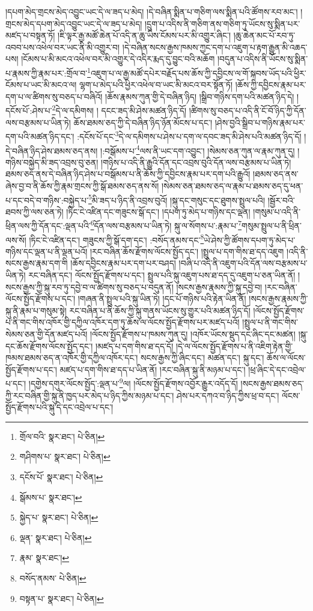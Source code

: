 །དཔག་མེད་གྲངས་མེད་འབྱུང་ཡང་དེ་ལ་ཟད་པ་མེད། །དེ་བཞིན་སྨིན་པ་གཅིག་ལས་སྨིན་པའི་ཚོགས་རབ་མང་། །གྲངས་མེད་དཔག་མེད་འབྱུང་ཡང་དེ་ལ་ཟད་པ་མེད། །དྲུག་པ་འདིས་ནི་གཅིག་ནས་གཅིག་ཏུ་ཡོངས་སུ་སྨིན་པར་མཛད་པ་བསྟན་ཏོ། །ཇི་ལྟར་རྒྱ་མཚོ་ཆེན་པོ་འདི་ན་ཆུ་ཡིས་ངོམས་པར་མི་འགྱུར་ཞིང་། །ཆུ་ཆེན་མང་པོ་རབ་ཏུ་འབབ་པས་འཕེལ་བར་ཡང་ནི་མི་འགྱུར་བ། །དེ་བཞིན་སངས་རྒྱས་ཁམས་ཀྱང་དག་པ་འཇུག་པ་རྟག་རྒྱུན་མི་འཆད་པས། །ངོམས་པ་མི་མངའ་འཕེལ་བར་མི་འགྱུར་དེ་འདིར་རྨད་དུ་བྱུང་བའི་མཆོག །བདུན་པ་འདིས་ནི་ཡོངས་སུ་སྨིན་པ་རྣམས་ཀྱི་རྣམ་པར་:གྲོལ་བ་\footnote{གྲོལ་བའི་  སྣར་ཐང་།  པེ་ཅིན། }འཇུག་པ་ལ་རྒྱ་མཚོ་དཔེར་བརྗོད་པས་ཆོས་ཀྱི་དབྱིངས་ལ་གོ་སྐབས་ཡོད་པའི་ཕྱིར་ངོམས་པ་ཡང་མི་མངའ་ལ། ལྷག་པ་མེད་པའི་ཕྱིར་འཕེལ་བ་ཡང་མི་མངའ་བར་སྟོན་ཏོ། །ཆོས་ཀྱི་དབྱིངས་རྣམ་པར་དག་པ་ལ་ཚིགས་སུ་བཅད་པ་བཞིའོ། །ཆོས་རྣམས་ཀུན་གྱི་དེ་བཞིན་ཉིད། །སྒྲིབ་གཉིས་དག་པའི་མཚན་ཉིད་དེ། །དངོས་པོ་:ཤེས་པ་\footnote{གཤིགས་པ་  སྣར་ཐང་།  པེ་ཅིན། }དེ་ལ་དམིགས། །
དངང་ཟད་མི་ཤེས་མཚན་ཉིད་དོ། །ཚིགས་སུ་བཅད་པ་འདི་ནི་ངོ་བོ་ཉིད་ཀྱི་དོན་ལས་བརྩམས་པ་ཡིན་ཏེ། ཆོས་ཐམས་ཅད་ཀྱི་དེ་བཞིན་ཉིད་ཉོན་མོངས་པ་དང་། །ཤེས་བྱའི་སྒྲིབ་པ་གཉིས་རྣམ་པར་དག་པའི་མཚན་ཉིད་དང་། :དངོས་པོ་དང་\footnote{དངོས་པོ་  སྣར་ཐང་།  པེ་ཅིན། }དེ་ལ་དམིགས་པ་ཤེས་པ་དག་ལ་དབང་ཟད་མི་ཤེས་པའི་མཚན་ཉིད་དོ། །དེ་བཞིན་ཉིད་ཤེས་ཐམས་ཅད་ནས། །:བསྒོམས་པ་\footnote{སྒོམས་པ་  སྣར་ཐང་། }ལས་ནི་ཡང་དག་འབྱུང་། །སེམས་ཅན་ཀུན་ལ་རྣམ་ཀུན་དུ། །གཉིས་བསྐྱེད་མི་ཟད་འབྲས་བུ་ཅན། །གཉིས་པ་འདི་ནི་རྒྱུའི་དོན་དང་འབྲས་བུའི་དོན་ལས་བརྩམས་པ་ཡིན་ཏེ། ཐམས་ཅད་ནས་དེ་བཞིན་ཉིད་ཤེས་པ་བསྒོམས་པ་ནི་ཆོས་ཀྱི་དབྱིངས་རྣམ་པར་དག་པའི་རྒྱུའོ། །ཐམས་ཅད་ནས་ཞེས་བྱ་བ་ནི་ཆོས་ཀྱི་རྣམ་གྲངས་ཀྱི་སྒོ་ཐམས་ཅད་ནས་སོ། །སེམས་ཅན་ཐམས་ཅད་ལ་རྣམ་པ་ཐམས་ཅད་དུ་ཕན་པ་དང་བདེ་བ་གཉིས་:བསྐྱེད་པ་\footnote{སྐྱེད་པ་  སྣར་ཐང་།  པེ་ཅིན། }མི་ཟད་པ་ཉིད་ནི་འབྲས་བུའོ། །སྐུ་དང་གསུང་དང་ཐུགས་སྤྲུལ་པའི། །སྦྱོར་བའི་ཐབས་ཀྱི་ལས་ཅན་ཏེ། །ཏིང་ངེ་འཛིན་དང་གཟུངས་སྒོ་དང་། །དཔག་ཏུ་མེད་པ་གཉིས་དང་ལྡན། །གསུམ་པ་འདི་ནི་ཕྲིན་ལས་ཀྱི་དོན་དང་:ལྡན་པའི་\footnote{ལྡན་  སྣར་ཐང་།  པེ་ཅིན། }དོན་ལས་བརྩམས་པ་ཡིན་ཏེ། སྐུ་ལ་སོགས་པ་:རྣམ་པ་\footnote{རྣམ་  སྣར་ཐང་། }གསུམ་སྤྲུལ་པ་ནི་ཕྲིན་ལས་སོ། །ཏིང་ངེ་འཛིན་དང་། གཟུངས་ཀྱི་སྒོ་དག་དང་། :བསོད་ནམས་དང་\footnote{བསོད་ནམས་  པེ་ཅིན། }ཡེ་ཤེས་ཀྱི་ཚོགས་དཔག་ཏུ་མེད་པ་གཉིས་དང་ལྡན་པ་ནི་ལྡན་པའོ། །རང་བཞིན་ཆོས་རྫོགས་ལོངས་སྤྱོད་དང་། །སྤྲུལ་པ་དག་གིས་ཐ་དད་འཇུག །འདི་ནི་སངས་རྒྱས་རྣམ་དག་གི །ཆོས་དབྱིངས་རྣམ་པར་དག་པར་བཤད། །བཞི་པ་འདི་ནི་འཇུག་པའི་དོན་ལས་བརྩམས་པ་ཡིན་ཏེ། རང་བཞིན་དང་། ལོངས་སྤྱོད་རྫོགས་པ་དང་། སྤྲུལ་པའི་སྐུ་འཇུག་པས་ཐ་དད་དུ་འཇུག་པ་ཅན་ཡིན་ནོ། །སངས་རྒྱས་ཀྱི་སྐུ་རབ་ཏུ་དབྱེ་བ་ལ་ཚིགས་སུ་བཅད་པ་བདུན་ནོ། །སངས་རྒྱས་རྣམས་ཀྱི་སྐུ་དབྱེ་བ། །རང་བཞིན་ལོངས་སྤྱོད་རྫོགས་པ་དང་། །གཞན་ནི་སྤྲུལ་པའི་སྐུ་ཡིན་ཏེ། །དང་པོ་གཉིས་པའི་རྟེན་ཡིན་ནོ། །སངས་རྒྱས་རྣམས་ཀྱི་སྐུ་ནི་རྣམ་པ་གསུམ་སྟེ། རང་བཞིན་པ་ནི་ཆོས་ཀྱི་སྐུ་གནས་ཡོངས་སུ་གྱུར་པའི་མཚན་ཉིད་དོ། །ལོངས་སྤྱོད་རྫོགས་པ་ནི་གང་གིས་འཁོར་གྱི་དཀྱིལ་འཁོར་དག་ཏུ་ཆོས་ལ་ལོངས་སྤྱོད་རྫོགས་པར་མཛད་པའོ། །སྤྲུལ་པ་ནི་གང་གིས་སེམས་ཅན་གྱི་དོན་མཛད་པའོ། །ལོངས་སྤྱོད་རྫོགས་པ་ཁམས་ཀུན་དུ། །འཁོར་ཡོངས་སྡུད་དང་ཞིང་དང་མཚན། །སྐུ་དང་ཆོས་རྫོགས་ལོངས་སྤྱོད་དང་། །མཛད་པ་དག་གིས་ཐ་དད་དོ། །དེ་ལ་ལོངས་སྤྱོད་རྫོགས་པ་ནི་འཇིག་རྟེན་གྱི་ཁམས་ཐམས་ཅད་ན་འཁོར་གྱི་དཀྱིལ་འཁོར་དང་། སངས་རྒྱས་ཀྱི་ཞིང་དང་། མཚན་དང་། སྐུ་དང་། ཆོས་ལ་ལོངས་སྤྱོད་རྫོགས་པ་དང་། མཛད་པ་དག་གིས་ཐ་དད་པ་ཡིན་ནོ། །རང་བཞིན་སྐུ་ནི་མཉམ་པ་དང་། །ཕྲ་ཞིང་དེ་དང་འབྲེལ་པ་དང་། །དགྱེས་དགུར་ལོངས་སྤྱོད་:ལྡན་པ་\footnote{བསྟན་པ་  སྣར་ཐང་།  པེ་ཅིན། }ལ། །ལོངས་སྤྱོད་རྫོགས་འབྱོར་རྒྱུར་འདོད་དོ། །སངས་རྒྱས་ཐམས་ཅད་ཀྱི་རང་བཞིན་གྱི་སྐུ་ནི་ཁྱད་པར་མེད་པ་ཉིད་ཀྱིས་མཉམ་པ་དང་། ཤེས་པར་དཀའ་བ་ཉིད་ཀྱིས་ཕྲ་བ་དང་། ལོངས་སྤྱོད་རྫོགས་པའི་སྐུ་དེ་དང་འབྲེལ་པ་དང་། 